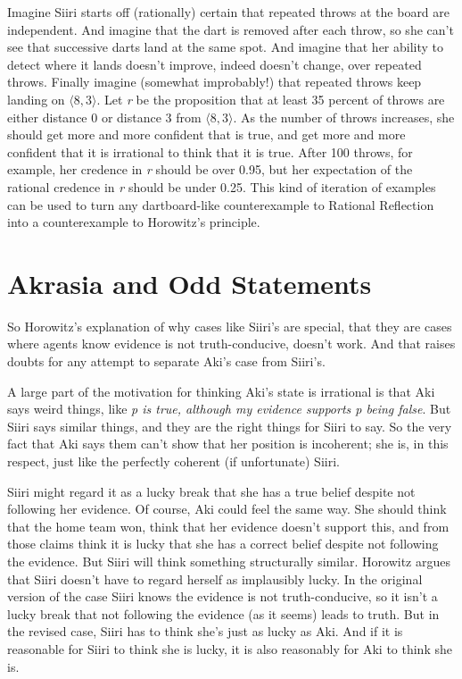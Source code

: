 Imagine \gls{Siiri} starts off (rationally) certain that repeated throws at the board are independent. And imagine that the dart is removed after each throw, so she can't see that successive darts land at the same spot. And imagine that her ability to detect where it lands doesn't improve, indeed doesn't change, over repeated throws. Finally imagine (somewhat improbably!) that repeated throws keep landing on $\langle 8, 3 \rangle$. Let \emph{r} be the proposition that at least 35 percent of throws are either distance 0 or distance 3 from $\langle 8, 3 \rangle$. As the number of throws increases, she should get more and more confident that is true, and get more and more confident that it is irrational to think that it is true. After 100 throws, for example, her credence in \emph{r} should be over 0.95, but her expectation of the rational credence in \emph{r} should be under 0.25. This kind of iteration of examples can be used to turn any dartboard-like counterexample to Rational Reflection into a counterexample to Horowitz's principle.

\section{Akrasia and Odd Statements}
\label{akrasiaandoddstatements}

So Horowitz's explanation of why cases like \gls{Siiri}'s are special, that they are cases where agents know evidence is not truth-conducive, doesn't work. And that raises doubts for any attempt to separate \gls{Aki}'s case from \gls{Siiri}'s.

A large part of the motivation for thinking \gls{Aki}'s state is irrational is that \gls{Aki} says weird things, like \emph{p is true, although my evidence supports p being false}. But \gls{Siiri} says similar things, and they are the right things for \gls{Siiri} to say. So the very fact that \gls{Aki} says them can't show that her position is incoherent; she is, in this respect, just like the perfectly coherent (if unfortunate) \gls{Siiri}.

\gls{Siiri} might regard it as a lucky break that she has a true belief despite not following her evidence. Of course, \gls{Aki} could feel the same way. She should think that the home team won, think that her evidence doesn't support this, and from those claims think it is lucky that she has a correct belief despite not following the evidence. But \gls{Siiri} will think something structurally similar. Horowitz argues that \gls{Siiri} doesn't have to regard herself as implausibly lucky. In the original version of the case \gls{Siiri} knows the evidence is not truth-conducive, so it isn't a lucky break that not following the evidence (as it seems) leads to truth. But in the revised case, \gls{Siiri} has to think she's just as lucky as \gls{Aki}. And if it is reasonable for \gls{Siiri} to think she is lucky, it is also reasonably for \gls{Aki} to think she is.

